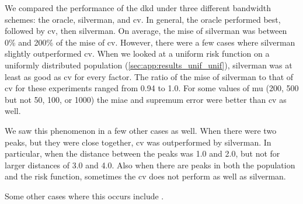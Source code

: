 


We compared the performance of the \gls{dkd} under three different bandwidth schemes:
the \gls{oracle}, \gls{silverman}, and \gls{cv}.
In general, the \gls{oracle} performed best, followed by \gls{cv}, then \gls{silverman}.
On average, the \gls{mise} of \gls{silverman} was between 0\% and 200\% of the \gls{mise} of \gls{cv}.
However, there were a few cases where \gls{silverman} slightly outperformed \gls{cv}.
When we looked at a uniform risk function on a uniformly distributed population (\cref{sec:app:results_unif_unif}), \gls{silverman} was at least as good as \gls{cv} for every \gls{factor}.
The ratio of the \gls{mise} of \gls{silverman} to that of \gls{cv} for these experiments ranged from 0.94 to 1.0.
For some values of \gls{mu} (200, 500 but not 50, 100, or 1000) the \gls{miae} and \gls{supremum error} were better than \gls{cv} as well.

We saw this phenomenon in a few other cases as well.
When there were two peaks, but they were close together, \gls{cv} was outperformed by \gls{silverman}.
In particular, when the distance between the peaks was 1.0 and 2.0, but not for larger distances of 3.0 and 4.0.
Also when there are peaks in both the population and the risk function, sometimes the \gls{cv} does not perform as well as \gls{silverman}.

Some other cases where this occurs include .